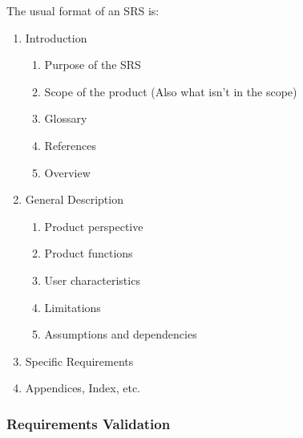\documentclass[
../../Software_Engineering_Summary.tex,
]
{subfiles}
\begin{document}
The usual format of an SRS is:

\begin{greenbox}
    \begin{enumerate}
        \item Introduction
        \begin{enumerate}
            \item Purpose of the SRS
            \item Scope of the product (Also what isn't in the scope)
            \item Glossary
            \item References
            \item Overview
        \end{enumerate}
        \item General Description
        \begin{enumerate}
            \item Product perspective
            \item Product functions
            \item User characteristics
            \item Limitations
            \item Assumptions and dependencies
        \end{enumerate}
        \item Specific Requirements
        \item Appendices, Index, etc.
    \end{enumerate}
\end{greenbox}

\subsubsection{Requirements Validation}
\end{document}
